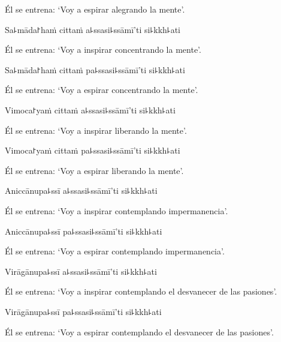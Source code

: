 \begin{english}
  Él se entrena: ‘Voy a espirar alegrando la mente’.
\end{english}

Sa꜕māda꜓haṁ cittaṁ a꜕ssasi꜕ssāmī'ti si꜕kkh꜕ati

\begin{english}
  Él se entrena: ‘Voy a inspirar concentrando la mente’.
\end{english}

Sa꜕māda꜓haṁ cittaṁ pa꜕ssasi꜕ssāmī'ti si꜕kkh꜕ati

\begin{english}
  Él se entrena: ‘Voy a espirar concentrando la mente’.
\end{english}

Vimoca꜓yaṁ cittaṁ a꜕ssasi꜕ssāmī'ti si꜕kkh꜕ati

\begin{english}
  Él se entrena: ‘Voy a inspirar liberando la mente’.
\end{english}

Vimoca꜓yaṁ cittaṁ pa꜕ssasi꜕ssāmī'ti si꜕kkh꜕ati

\begin{english}
  Él se entrena: ‘Voy a espirar liberando la mente’.
\end{english}

Aniccānupa꜕ssī a꜕ssasi꜕ssāmī'ti si꜕kkh꜕ati

\begin{english}
  Él se entrena: ‘Voy a inspirar contemplando impermanencia’.
\end{english}

Aniccānupa꜕ssī pa꜕ssasi꜕ssāmī'ti si꜕kkh꜕ati

\begin{english}
  Él se entrena: ‘Voy a espirar contemplando impermanencia’.
\end{english}

Virāgānupa꜕ssī a꜕ssasi꜕ssāmī'ti si꜕kkh꜕ati

\begin{english}
  Él se entrena: ‘Voy a inspirar contemplando el desvanecer de las pasiones’.
\end{english}

Virāgānupa꜕ssī pa꜕ssasi꜕ssāmī'ti si꜕kkh꜕ati

\begin{english}
  Él se entrena: ‘Voy a espirar contemplando el desvanecer de las pasiones’.
\end{english}

